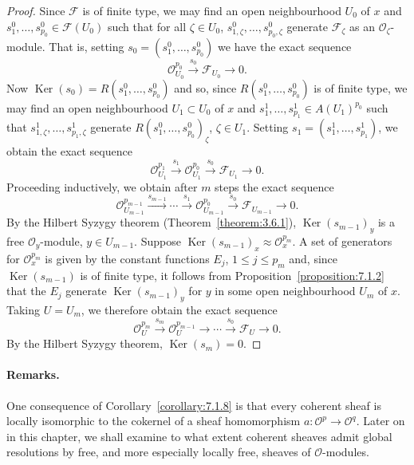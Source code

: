\begin{proof}
Since $\mathcal{F}$ is of finite type, we may find an open neighbourhood $U_0$ of $x$ and $s_1^0,\ldots,s_{p_0}^0\in\mathcal{F}(U_0)$ such that for all $\zeta\in U_0$, $s_{1,\zeta}^0,\ldots,s_{p_0,\zeta}^0$ generate $\mathcal{F}_\zeta$ as an $\mathcal{O}_\zeta$-module. That is, setting $s_0=(s_1^0,\ldots,s_{p_0}^0)$ we have the exact sequence
\[
\mathcal{O}_{U_0}^{p_0}\xrightarrow{s_0}\mathcal{F}_{U_0}\to0.
\]
Now $\operatorname{Ker}(s_0)=R(s_1^0,\ldots,s_{p_0}^0)$ and so, since $R(s_1^0,\ldots,s_{p_0}^0)$ is of finite type, we may find an open neighbourhood $U_1\subset U_0$ of $x$ and $s_1^1,\ldots,s_{p_1}^1\in A(U_1)^{p_0}$ such that $s_{1,\zeta}^1,\ldots,s_{p_1,\zeta}^1$ generate $R(s_1^0,\ldots,s_{p_0}^0)_\zeta$, $\zeta\in U_1$. Setting $s_1=(s_1^1,\ldots,s_{p_1}^1)$, we obtain the exact sequence
\[
\mathcal{O}_{U_1}^{p_1}\xrightarrow{s_1}\mathcal{O}_{U_1}^{p_0}\xrightarrow{s_0}\mathcal{F}_{U_1}\to0.
\]
Proceeding inductively, we obtain after $m$ steps the exact sequence
\[
\mathcal{O}_{U_{m-1}}^{p_{m-1}}\xrightarrow{s_{m-1}}\cdots\xrightarrow{s_1}\mathcal{O}_{U_{m-1}}^{p_0}\xrightarrow{s_0}\mathcal{F}_{U_{m-1}}\to0.
\]
By the Hilbert Syzygy theorem (Theorem~\ref{theorem:3.6.1}), $\operatorname{Ker}(s_{m-1})_y$ is a free $\mathcal{O}_y$-module, $y\in U_{m-1}$. Suppose $\operatorname{Ker}(s_{m-1})_x\approx\mathcal{O}_x^{p_m}$. A set of generators for $\mathcal{O}_x^{p_m}$ is given by the constant functions $E_j$, $1\leq j\leq p_m$ and, since $\operatorname{Ker}(s_{m-1})$ is of finite type, it follows from Proposition~\ref{proposition:7.1.2} that the $E_j$ generate $\operatorname{Ker}(s_{m-1})_y$ for $y$ in some open neighbourhood $U_m$ of $x$. Taking $U=U_m$, we therefore obtain the exact sequence
\[
\mathcal{O}_U^{p_m}\xrightarrow{s_m}\mathcal{O}_U^{p_{m-1}}\to\cdots\xrightarrow{s_0}\mathcal{F}_U\to0.
\]
By the Hilbert Syzygy theorem, $\operatorname{Ker}(s_m)=0$.
\end{proof}
\paragraph{Remarks.} One consequence of Corollary~\ref{corollary:7.1.8} is that every coherent sheaf is locally isomorphic to the cokernel of a sheaf homomorphism $a:\mathcal{O}^p\to\mathcal{O}^q$. Later on in this chapter, we shall examine to what extent coherent sheaves admit global resolutions by free, and more especially locally free, sheaves of $\mathcal{O}$-modules.
